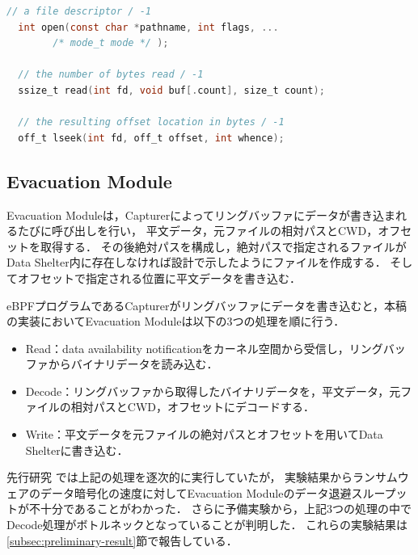 \begin{lstlisting}[caption=Signatures of the related system calls. The comment lines indicate the return value on success / error., label=code:syscalls, language=C]
  // a file descriptor / -1
  int open(const char *pathname, int flags, ...
        /* mode_t mode */ );
        
  // the number of bytes read / -1
  ssize_t read(int fd, void buf[.count], size_t count);

  // the resulting offset location in bytes / -1
  off_t lseek(int fd, off_t offset, int whence);
\end{lstlisting}


\subsection{Evacuation Module}
Evacuation Moduleは，Capturerによってリングバッファにデータが書き込まれるたびに呼び出しを行い，
平文データ，元ファイルの相対パスとCWD，オフセットを取得する．
その後絶対パスを構成し，絶対パスで指定されるファイルがData Shelter内に存在しなければ設計で示したようにファイルを作成する．
そしてオフセットで指定される位置に平文データを書き込む．

eBPFプログラムであるCapturerがリングバッファにデータを書き込むと，本稿の実装においてEvacuation Moduleは以下の3つの処理を順に行う．
\begin{itemize}
  \item Read：data availability notificationをカーネル空間から受信し，リングバッファからバイナリデータを読み込む．
  \item Decode：リングバッファから取得したバイナリデータを，平文データ，元ファイルの相対パスとCWD，オフセットにデコードする．
  \item Write：平文データを元ファイルの絶対パスとオフセットを用いてData Shelterに書き込む．
\end{itemize}
先行研究 \cite{css2024} では上記の処理を逐次的に実行していたが，
実験結果からランサムウェアのデータ暗号化の速度に対してEvacuation Moduleのデータ退避スループットが不十分であることがわかった．
さらに予備実験から，上記3つの処理の中でDecode処理がボトルネックとなっていることが判明した．
これらの実験結果は\ref{subsec:preliminary-result}節で報告している．

